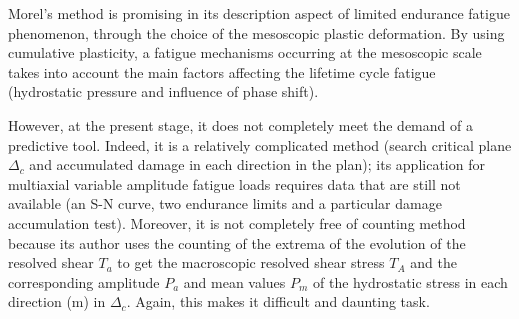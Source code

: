 Morel's method is promising in its description aspect of limited endurance fatigue phenomenon, through the choice of the  mesoscopic plastic deformation. By using cumulative plasticity, a fatigue mechanisms occurring at the mesoscopic scale takes into account the main factors affecting the lifetime cycle fatigue (hydrostatic pressure and influence of phase shift). 

However, at the present stage, it does not completely meet the demand of a predictive tool. Indeed, it is a relatively complicated method (search critical plane $\Delta_c$ and accumulated damage in each direction in the plan); its application for multiaxial variable amplitude fatigue loads requires data that are still not available (an S-N curve, two endurance limits and a particular  damage accumulation test). Moreover, it is not completely free of counting method because its author uses the counting of the extrema of the evolution of the resolved shear $T_a$ to get the macroscopic resolved shear stress $T_A$ and the corresponding amplitude $P_a$ and mean values $P_m$ of the hydrostatic stress in each direction (m) in $\Delta_c$. Again, this makes it difficult and daunting task.
